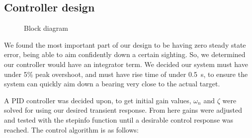 ﻿\subsection{Controller design}

\begin{figure}
    \begin{center}  
    \end{center}
    \caption{Block diagram}
    \label{fig:controller1}
\end{figure}

We found the most important part of our design to be having zero steady state error, being able to aim confidently down a certain sighting. So, we determined our controller would have an integrator term. We decided our system must have under 5\% peak overshoot, and must have rise time of under \SI{0.5}{\second}, to ensure the system can quickly aim down a bearing very close to the actual target.

A PID controller was decided upon, to get initial gain values, $\omega_n$ and $\zeta$ were solved for using our desired transient response. From here gains were adjusted and tested with the stepinfo function until a desirable control response was reached. The control algorithm is as follows:

